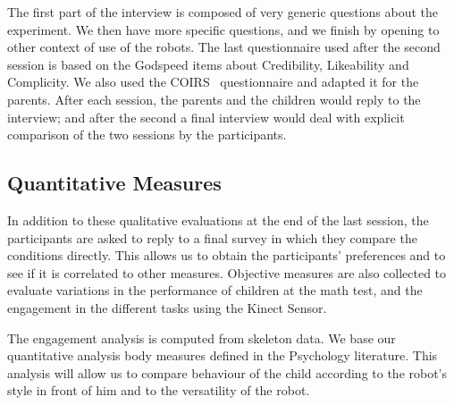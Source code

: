 \documentclass[a4paper,twocolumn]{svjour3}
\begin{document}
The first part of the interview is composed of very generic questions about the experiment. 
We then have more specific questions, and we finish by opening to other context of use of the robots.
The last questionnaire used after the second session is based on the Godspeed\cite{Bartneck2008b} items about Credibility, Likeability and Complicity. 
We also used the COIRS~\cite{Robert2014} questionnaire and adapted it for the parents.
After each session, the parents and the children would reply to the interview; and after the second a final interview would deal with explicit comparison of the two sessions by the participants.

\subsection{Quantitative Measures}
In addition to these qualitative evaluations at the end of the last session, the participants are asked to reply to a final survey in which they compare the conditions directly. 
This allows us to obtain the participants' preferences and to see if it is correlated to other measures. 
Objective measures are also collected to evaluate variations in the performance of children at the math test, and the engagement in the different tasks using the Kinect Sensor.

The engagement analysis is computed from skeleton data.
We base our quantitative analysis body measures defined in the Psychology literature.
This analysis will allow us to compare behaviour of the child according to the robot's style in front of him and to the versatility of the robot.

\end{document}
